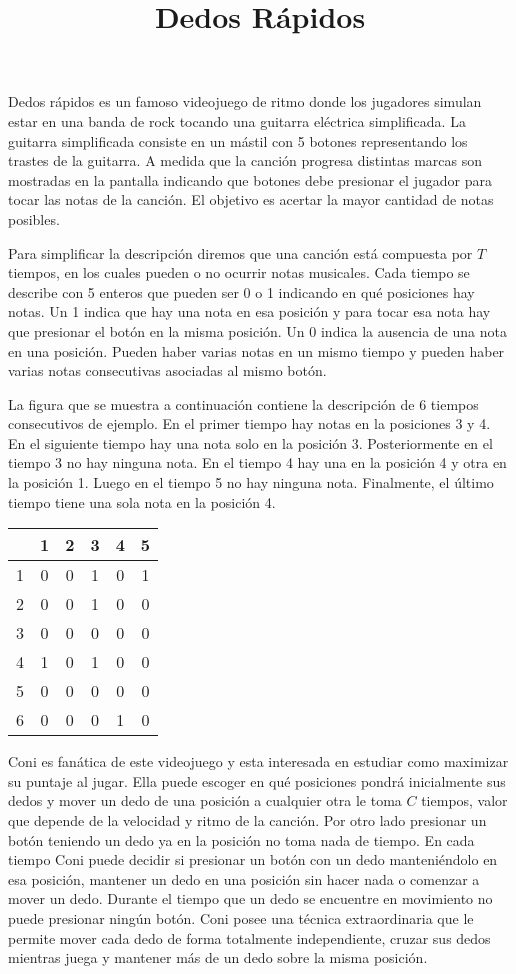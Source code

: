 \documentclass{oci}
\title{Dedos Rápidos}
\begin{document}
\begin{problemDescription}
  Dedos rápidos es un famoso videojuego de ritmo donde los jugadores simulan
  estar en una banda de rock tocando una guitarra eléctrica simplificada.
  La guitarra simplificada consiste en un mástil con 5 botones representando los
  trastes de la guitarra.
  A medida que la canción progresa distintas marcas son mostradas en la pantalla
  indicando que botones debe presionar el jugador para tocar las notas de la canción.
  El objetivo es acertar la mayor cantidad de notas posibles.

  Para simplificar la descripción diremos que una canción está compuesta por $T$
  tiempos, en los cuales pueden o no ocurrir notas musicales.
  Cada tiempo se describe con 5 enteros que pueden ser 0 o 1 indicando en qué
  posiciones hay notas.
  Un 1 indica que hay una nota en esa posición y para tocar esa nota hay que
  presionar el botón en la misma posición.
  Un 0 indica la ausencia de una nota en una posición.
  Pueden haber varias notas en un mismo tiempo y pueden haber varias
  notas consecutivas asociadas al mismo botón.

  La figura que se muestra a continuación contiene la descripción de 6 tiempos
  consecutivos de ejemplo.
  En el primer tiempo hay notas en la posiciones 3 y 4.
  En el siguiente tiempo hay una nota solo en la posición 3.
  Posteriormente en el tiempo 3 no hay ninguna nota.
  En el tiempo 4 hay una en la posición 4 y otra en la posición 1.
  Luego en el tiempo 5 no hay ninguna nota.
  Finalmente, el último tiempo tiene una sola nota en la posición 4.

  \begin{center}
    \begin{tabular}{r|ccccc}
        & 1 & 2 & 3 & 4 & 5 \\
      \hline
      1 & 0 & 0 & 1 & 0 & 1 \\
      2 & 0 & 0 & 1 & 0 & 0 \\
      3 & 0 & 0 & 0 & 0 & 0 \\
      4 & 1 & 0 & 1 & 0 & 0 \\
      5 & 0 & 0 & 0 & 0 & 0 \\
      6 & 0 & 0 & 0 & 1 & 0 \\
    \end{tabular}
  \end{center}

  Coni es fanática de este videojuego y esta interesada en estudiar como
  maximizar su puntaje al jugar.
  Ella puede escoger en qué posiciones pondrá inicialmente sus dedos y mover un
  dedo de una posición a cualquier otra le toma $C$ tiempos, valor que depende
  de la velocidad y ritmo de la canción.
  Por otro lado presionar un botón teniendo un dedo ya en la posición no toma
  nada de tiempo.
  En cada tiempo Coni puede decidir si presionar un botón con un dedo
  manteniéndolo en esa posición, mantener un dedo en una posición sin hacer nada
  o comenzar a mover un dedo.
  Durante el tiempo que un dedo se encuentre en movimiento no puede presionar
  ningún botón.
  Coni posee una técnica extraordinaria que le permite mover cada dedo
  de forma totalmente independiente, cruzar sus dedos mientras juega y mantener
  más de un dedo sobre la misma posición.


\end{problemDescription}
\end{document}
